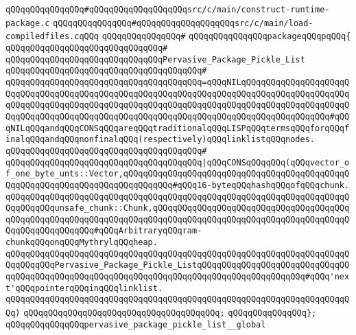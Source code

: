 \verb|qQQqqQQqqQQqqQQq#qQQqqQQqqQQqqQQqqQQqsrc/c/main/construct-runtime-package.c|\newline
\verb|qQQqqQQqqQQqqQQq#qQQqqQQqqQQqqQQqqQQqsrc/c/main/load-compiledfiles.cqQQq|\newline
\verb|qQQqqQQqqQQqqQQq#|\newline
\verb|qQQqqQQqqQQqqQQqpackageqQQqpqQQq{|\newline
\verb|qQQqqQQqqQQqqQQqqQQqqQQqqQQqqQQq#|\newline
\verb|qQQqqQQqqQQqqQQqqQQqqQQqqQQqqQQqPervasive_Package_Pickle_List|\newline
\verb|qQQqqQQqqQQqqQQqqQQqqQQqqQQqqQQqqQQqqQQq#|\newline
\verb|qQQqqQQqqQQqqQQqqQQqqQQqqQQqqQQqqQQqqQQq=qQQqNILqQQqqQQqqQQqqQQqqQQqqQQqqQQqqQQqqQQqqQQqqQQqqQQqqQQqqQQqqQQqqQQqqQQqqQQqqQQqqQQqqQQqqQQqqQQqqQQqqQQqqQQqqQQqqQQqqQQqqQQqqQQqqQQqqQQqqQQqqQQqqQQqqQQqqQQqqQQqqQQqqQQqqQQqqQQqqQQqqQQqqQQqqQQqqQQqqQQqqQQqqQQqqQQqqQQqqQQqqQQqqQQqqQQq#qQQqNILqQQqandqQQqCONSqQQqareqQQqtraditionalqQQqLISPqQQqtermsqQQqforqQQqfinalqQQqandqQQqnonfinalqQQq(respectively)qQQqlinklistqQQqnodes.|\newline
\verb|qQQqqQQqqQQqqQQqqQQqqQQqqQQqqQQqqQQqqQQq#|\newline
\verb|qQQqqQQqqQQqqQQqqQQqqQQqqQQqqQQqqQQqqQQq|\verb#|qQQqCONSqQQqqQQq(qQQqvector_of_one_byte_unts::Vector,qQQqqQQqqQQqqQQqqQQqqQQqqQQqqQQqqQQqqQQqqQQqqQQqqQQqqQQqqQQqqQQqqQQqqQQqqQQqqQQq#\verb|#qQQq16-byteqQQqhashqQQqofqQQqchunk.|\newline
\verb|qQQqqQQqqQQqqQQqqQQqqQQqqQQqqQQqqQQqqQQqqQQqqQQqqQQqqQQqqQQqqQQqqQQqqQQqqQQqqQQqunsafe_chunk::Chunk,qQQqqQQqqQQqqQQqqQQqqQQqqQQqqQQqqQQqqQQqqQQqqQQqqQQqqQQqqQQqqQQqqQQqqQQqqQQqqQQqqQQqqQQqqQQqqQQqqQQqqQQqqQQqqQQqqQQqqQQqqQQqqQQq#qQQqArbitraryqQQqram-chunkqQQqonqQQqMythrylqQQqheap.|\newline
\verb|qQQqqQQqqQQqqQQqqQQqqQQqqQQqqQQqqQQqqQQqqQQqqQQqqQQqqQQqqQQqqQQqqQQqqQQqqQQqqQQqPervasive_Package_Pickle_ListqQQqqQQqqQQqqQQqqQQqqQQqqQQqqQQqqQQqqQQqqQQqqQQqqQQqqQQqqQQqqQQqqQQqqQQqqQQqqQQqqQQqqQQqqQQq#qQQq'next'qQQqpointerqQQqinqQQqlinklist.|\newline
\verb|qQQqqQQqqQQqqQQqqQQqqQQqqQQqqQQqqQQqqQQqqQQqqQQqqQQqqQQqqQQqqQQqqQQqqQQq)|\newline
\verb|qQQqqQQqqQQqqQQqqQQqqQQqqQQqqQQqqQQqqQQq;|\newline
\verb|qQQqqQQqqQQqqQQq};|\newline
\newline
\verb|qQQqqQQqqQQqqQQqpervasive_package_pickle_list__global|\newline
